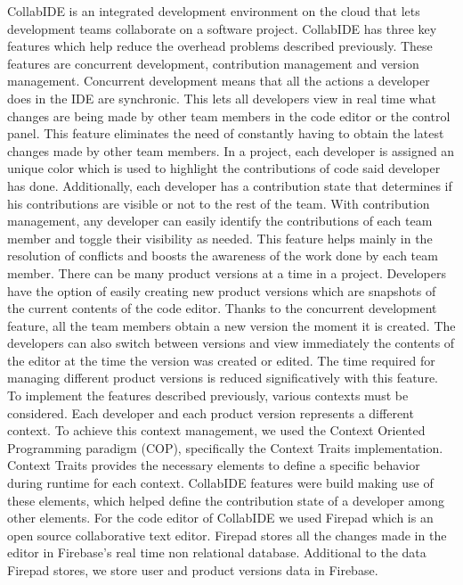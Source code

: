 \documentclass[10pt, conference, draft]{IEEEtran}
\begin{document}
CollabIDE is an integrated development environment on the cloud that lets development teams collaborate on a software project. CollabIDE has three key features which help reduce the overhead problems described previously. These features are concurrent development, contribution management and version management.
Concurrent development means that all the actions a developer does in the IDE are synchronic. This lets all developers view in real time what changes are being made by other team members in the code editor or the control panel. This feature eliminates the need of constantly having to obtain the latest changes made by other team members. 
In a project, each developer is assigned an unique color which is used to highlight the contributions of code said developer has done. Additionally, each developer has a contribution state that determines if his contributions are visible or not to the rest of the team. With contribution management, any developer can easily identify the contributions of each team member and toggle their visibility as needed. This feature helps mainly in the resolution of conflicts and boosts the awareness of the work done by each team member.
There can be many product versions at a time in a project. Developers have the option of easily creating new product versions which are snapshots of the current contents of the code editor. Thanks to the concurrent development feature, all the team members obtain a new version the moment it is created. The developers can also switch between versions and view immediately the contents of the editor at the time the version was created or edited. The time required for managing different product versions is reduced significatively with this feature.
To implement the features described previously, various contexts must be considered. Each developer and each product version represents a different context. To achieve this context management, we used the Context Oriented Programming paradigm (COP), specifically the Context Traits implementation. Context Traits provides the necessary elements to define a specific behavior during runtime for each context. CollabIDE features were build making use of these elements, which helped define the contribution state of a developer among other elements.
For the code editor of CollabIDE we used Firepad which is an open source collaborative text editor. Firepad stores all the changes made in the editor in Firebase’s real time non relational database. Additional to the data Firepad stores, we store user and product versions data in Firebase.
\end{document}
